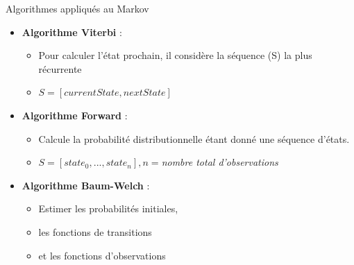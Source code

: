 \documentclass[aspectratio=169,xcolor=dvipsnames, t]{beamer}
\begin{document}

\begin{frame}{Algorithmes appliqués au Markov}
	
	\begin{itemize}
		\item \textbf{Algorithme Viterbi} :
		\begin{itemize}
			\item Pour calculer l'état prochain, il considère la séquence (S) la plus récurrente
			\item $S=[currentState, nextState]$
		\end{itemize}
	
		\item \textbf{Algorithme Forward} :
		\begin{itemize}
			\item Calcule la probabilité distributionnelle étant donné une séquence  d'états.
			\item $S=[state_0,..., state_n] , n = $\textit{nombre total d'observations}
		\end{itemize}
	
		\item \textbf{Algorithme Baum-Welch} :
		\begin{itemize}
			\item Estimer les probabilités initiales,
			\item les fonctions de transitions
			\item et les fonctions d'observations
		\end{itemize}
		  
	\end{itemize}
	
\end{frame}


\end{document}
